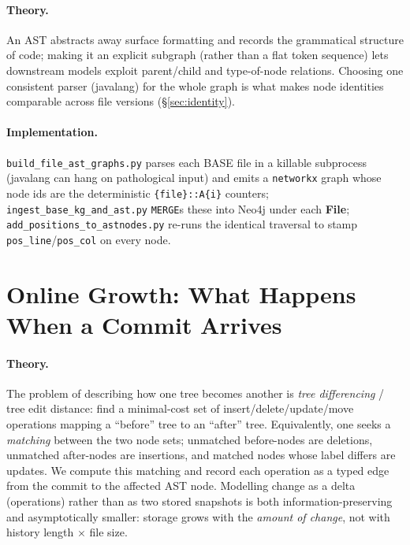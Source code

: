 \documentclass[11pt,a4paper]{article}
\newcommand{\code}[1]{\texttt{#1}}
\newcommand{\node}[1]{\textcolor{kgblue}{\textbf{#1}}}
\begin{document}
	\paragraph{Theory.} An AST abstracts away surface formatting and records the
	grammatical structure of code; making it an explicit subgraph (rather than a
	flat token sequence) lets downstream models exploit parent/child and
	type-of-node relations. Choosing one consistent parser (javalang) for the whole
	graph is what makes node identities comparable across file versions
	(\S\ref{sec:identity}).
	
	\paragraph{Implementation.} \texttt{build\_file\_ast\_graphs.py} parses each
	BASE file in a killable subprocess (javalang can hang on pathological input) and
	emits a \texttt{networkx} graph whose node ids are the deterministic
	\texttt{\{file\}::A\{i\}} counters; \texttt{ingest\_base\_kg\_and\_ast.py}
	\texttt{MERGE}s these into Neo4j under each \node{File};
	\texttt{add\_positions\_to\_astnodes.py} re-runs the identical traversal to stamp
	\code{pos\_line}/\code{pos\_col} on every node.
	
	\section{Online Growth: What Happens When a Commit Arrives}\label{sec:online}
	\paragraph{Theory.} The problem of describing how one tree becomes another is
	\emph{tree differencing} / tree edit distance: find a minimal-cost set of
	insert/delete/update/move operations mapping a ``before'' tree to an ``after''
	tree. Equivalently, one seeks a \emph{matching} between the two node sets;
	unmatched before-nodes are deletions, unmatched after-nodes are insertions, and
	matched nodes whose label differs are updates. We compute this matching and
	record each operation as a typed edge from the commit to the affected AST node.
	Modelling change as a delta (operations) rather than as two stored snapshots is
	both information-preserving and asymptotically smaller: storage grows with the
	\emph{amount of change}, not with history length $\times$ file size.
	
\end{document}
